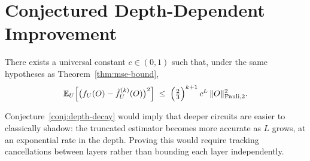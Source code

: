 \chapter{Conjectured Depth-Dependent Improvement}

\begin{conjecture}
  \label{conj:depth-decay}
  There exists a universal constant $c \in (0,1)$ such that, under the same
  hypotheses as Theorem~\ref{thm:mse-bound},
  \[
    \mathbb{E}_U\!\left[\bigl(f_U(O) - \tilde{f}_U^{(k)}(O)\bigr)^2\right]
    \;\leq\;
    \Bigl(\tfrac{2}{3}\Bigr)^{k+1}\,c^L\,\|O\|_{\mathrm{Pauli},2}^2.
  \]
\end{conjecture}

\begin{remark}
  Conjecture~\ref{conj:depth-decay} would imply that deeper circuits are easier to
  classically shadow: the truncated estimator becomes more accurate as $L$ grows,
  at an exponential rate in the depth.  Proving this would require tracking
  cancellations between layers rather than bounding each layer independently.
\end{remark}
